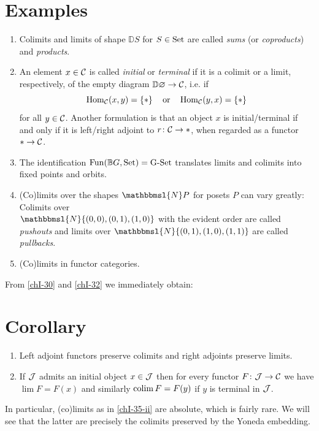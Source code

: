     \section{Examples}
        \begin{enumerate}[label=\roman*)]
            \item 
                Colimits and limits of shape $\mathbb{D}S$ for $S \in \operatorname{Set}$ are called \emph{sums} (or \emph{coproducts}) and \emph{products}.
            \item 
                An element $x \in \mathcal{C}$ is called \emph{initial} or \emph{terminal} if it is a colimit or a limit, respectively, of the empty diagram $\mathbb{D}\varnothing \to \mathcal{C}$, i.e. if
                \begin{equation*}
                    \operatorname{Hom}_{\mathcal{C}}(x, y) = \left\{ * \right\} \quad \text{or} \quad \operatorname{Hom}_{\mathcal{C}}(y, x) = \left\{ * \right\}
                \end{equation*}
                for all $y \in \mathcal{C}$. Another formulation is that an object $x$ is initial/terminal if and only if it is left/right adjoint to $r \colon \mathcal{C} \to *$, when regarded as a functor $* \to \mathcal{C}$.
            \item 
                The identification $\operatorname{Fun}(\mathbb{B}G, \operatorname{Set}) = \text{G-Set}$ translates limits and colimits into fixed points and orbits.
            \item 
                (Co)limits over the shapes $\mathbbmsl{N}P$ for posets $P$ can vary greatly: Colimits over \\ $\mathbbmsl{N}\{ (0, 0), (0, 1), (1, 0) \}$ with the evident order are called \emph{pushouts} and limits over $\mathbbmsl{N}\{ (0, 1), (1, 0), (1, 1) \}$ are called \emph{pullbacks}.
            \item 
                (Co)limits in functor categories.
        \end{enumerate}
        From \ref{chI-30} and \ref{chI-32} we immediately obtain:
    \section{Corollary}\label{chI-35}
        \begin{enumerate}[label=\roman*)]
            \item Left adjoint functors preserve colimits and right adjoints preserve limits.
            \item If $\mathcal{J}$ admits an initial object $x \in \mathcal{J}$ then for every functor $F \colon \mathcal{J} \to \mathcal{C}$ we have $\lim F = F(x)$ and similarly $\operatorname*{colim} F = F(y)$ if $y$ is terminal in $\mathcal{J}$.\label{chI-35-ii}
        \end{enumerate}
        In particular, (co)limits as in \ref{chI-35-ii} are absolute, which is fairly rare. We will see that the latter are precisely the colimits preserved by the Yoneda embedding.
        \medskip

